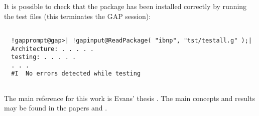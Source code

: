 \documentclass[a4paper,11pt]{report}
\begin{document}
{\begin{Verbatim}[commandchars=!@|,fontsize=\small,frame=single,label=Example]
\end{Verbatim}
 

 It is possible to check that the package has been installed correctly by
running the test files (this terminates the \textsf{GAP} session): 

 
\begin{Verbatim}[commandchars=!@|,fontsize=\small,frame=single,label=Example]
  
  !gapprompt@gap>| !gapinput@ReadPackage( "ibnp", "tst/testall.g" );|
  Architecture: . . . . . 
  testing: . . . . . 
  . . . 
  #I  No errors detected while testing
  
\end{Verbatim}
 

 The main reference for this work is Evans' thesis \cite{gareth-thesis}. The main concepts and results may be found in the papers \cite{Beaumont} and \cite{EW-JSC}. }

         
\end{document}
